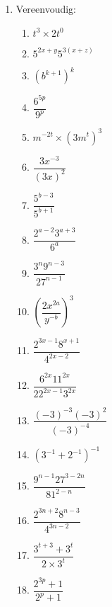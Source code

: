 \begin{eocexercises}{}

  \begin{enumerate}[label=\textbf{\arabic*}., itemsep=5pt]
  \item Vereenvoudig:
    \begin{multicols}{2}
      \begin{enumerate}[label=\textbf{(\alph*)}, itemsep=7pt]
      \item $ t^3 \times 2t^0 $
      \item $ 5^{2x+y} 5^{3(x+z)} $
      \item $ (b^{k+1})^k $
      \item $ \dfrac{6^{5p}}{9^p} $
      \item $ m^{-2t} \times (3m^t)^3 $
      \item $\dfrac{3{x}^{-3}}{{(3x)}^{2}}$
      \item $\dfrac{{5}^{b-3}}{{5}^{b+1}}$
      \item $\dfrac{{2}^{a-2} {3}^{a+3}}{{6}^{a}}$
      \item $\dfrac{{3}^{n} {9}^{n-3}}{{27}^{n-1}}$
      \item ${\left(\dfrac{2{x}^{2a}}{{y}^{-b}}\right)}^{3}$
      \item $\dfrac{{2}^{3x-1} {8}^{x+1}}{{4}^{2x-2}}$
      \item $\dfrac{{6}^{2x} {11}^{2x}}{{22}^{2x-1} {3}^{2x}}$
      \item $\dfrac{{(-3)}^{-3} {(-3)}^{2}}{{(-3)}^{-4}}$
      \item ${({3}^{-1}+{2}^{-1})}^{-1}$
      \item $\dfrac{{9}^{n-1} {27}^{3-2n}}{{81}^{2-n}}$
      \item $\dfrac{{2}^{3n+2} {8}^{n-3}}{{4}^{3n-2}}$
      \item $\dfrac{3^{t+3} + 3^t}{2 \times 3^t} $
      \item $\dfrac{2^{3p} +1}{2^p + 1} $
      \end{enumerate}
    \end{multicols}


\end{enumerate}
\end{eocexercises}
